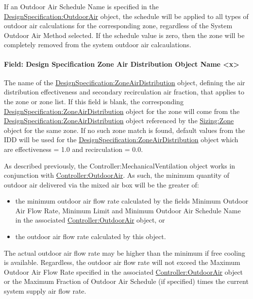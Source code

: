 If an Outdoor Air Schedule Name is specified in the \hyperref[designspecificationoutdoorair]{DesignSpecification:OutdoorAir} object, the schedule will be applied to all types of outdoor air calculations for the corresponding zone, regardless of the System Outdoor Air Method selected. If the schedule value is zero, then the zone will be completely removed from the system outdoor air calcaulations.

\paragraph{Field: Design Specification Zone Air Distribution Object Name \textless{}x\textgreater{}}\label{field-design-specification-zone-air-distribution-object-name-x}

The name of the \hyperref[designspecificationzoneairdistribution]{DesignSpecification:ZoneAirDistribution} object, defining the air distribution effectiveness and secondary recirculation air fraction, that applies to the zone or zone list. If this field is blank, the corresponding \hyperref[designspecificationzoneairdistribution]{DesignSpecification:ZoneAirDistribution} object for the zone will come from the \hyperref[designspecificationzoneairdistribution]{DesignSpecification:ZoneAirDistribution} object referenced by the \hyperref[sizingzone]{Sizing:Zone} object for the same zone. If no such zone match is found, default values from the IDD will be used for the \hyperref[designspecificationzoneairdistribution]{DesignSpecification:ZoneAirDistribution} object which are effectiveness = 1.0 and recirculation = 0.0.

As described previously, the Controller:MechanicalVentilation object works in conjunction with \hyperref[controlleroutdoorair]{Controller:OutdoorAir}. As such, the minimum quantity of outdoor air delivered via the mixed air box will be the greater of:

\begin{itemize}
\item
  the minimum outdoor air flow rate calculated by the fields Minimum Outdoor Air Flow Rate, Minimum Limit and Minimum Outdoor Air Schedule Name in the associated \hyperref[controlleroutdoorair]{Controller:OutdoorAir} object, or
\item
  the outdoor air flow rate calculated by this object.
\end{itemize}

The actual outdoor air flow rate may be higher than the minimum if free cooling is available. Regardless, the outdoor air flow rate will not exceed the Maximum Outdoor Air Flow Rate specified in the associated \hyperref[controlleroutdoorair]{Controller:OutdoorAir} object or the Maximum Fraction of Outdoor Air Schedule (if specified) times the current system supply air flow rate.

